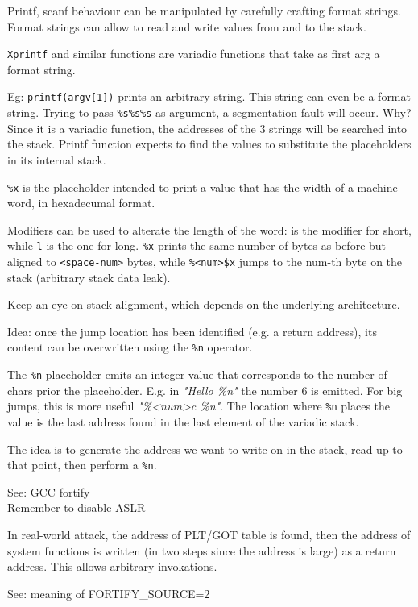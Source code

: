 Printf, scanf behaviour can be manipulated by carefully crafting format strings.
Format strings can allow to read and write values from and to the stack.

\texttt{Xprintf} and similar functions are variadic functions that take as first arg a format string.

Eg: \texttt{printf(argv[1])} prints an arbitrary string. This string can even be a format string.
Trying to pass \texttt{\%s\%s\%s} as argument, a segmentation fault will occur.
Why? Since it is a variadic function, the addresses of the 3 strings will be searched into the stack.
Printf function expects to find the values to substitute the placeholders in its internal stack.

\texttt{\%x} is the placeholder intended to print a value that has the width of a machine word, in hexadecumal format.

Modifiers can be used to alterate the length of the word:  is the modifier for short, while \texttt{l} is the one for long.
\texttt{\%<space-num>x} prints the same number of bytes as before but aligned to \texttt{<space-num>} bytes, while \texttt{\%<num>\$<space-num>x} jumps to the num-th byte on the stack (arbitrary stack data leak).

Keep an eye on stack alignment, which depends on the underlying architecture.

Idea: once the jump location has been identified (e.g. a return address), its content can be overwritten using the \texttt{\%n} operator.

The \texttt{\%n} placeholder emits an integer value that corresponds to the number of chars prior the placeholder.
E.g. in \textit{"Hello \%n"} the number 6 is emitted. For big jumps, this is more useful \textit{"\%<num>c \%n"}.
The location where \texttt{\%n} places the value is the last address found in the last element of the variadic stack.

The idea is to generate the address we want to write on in the stack, read up to that point, then perform a \texttt{\%n}.

See: GCC fortify \\
Remember to disable ASLR

In real-world attack, the address of PLT/GOT table is found, then the address of system functions is written (in two steps since the address is large) as a return address.
This allows arbitrary invokations.

See: meaning of FORTIFY_SOURCE=2

